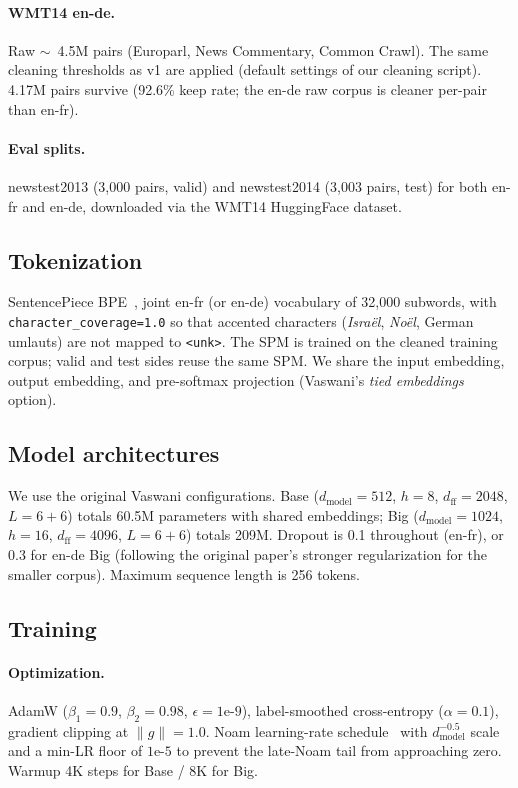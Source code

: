 \paragraph{WMT14 en-de.} Raw $\sim$~4.5M pairs (Europarl, News Commentary, Common Crawl). The same cleaning thresholds as v1 are applied (default settings of our cleaning script). 4.17M pairs survive (92.6\% keep rate; the en-de raw corpus is cleaner per-pair than en-fr).

\paragraph{Eval splits.} newstest2013 (3,000 pairs, valid) and newstest2014 (3,003 pairs, test) for both en-fr and en-de, downloaded via the WMT14 HuggingFace dataset.

\subsection{Tokenization}
SentencePiece BPE~\cite{sennrich2016neural, kudo2018sentencepiece}, joint en-fr (or en-de) vocabulary of 32{,}000 subwords, with \texttt{character\_coverage=1.0} so that accented characters (\textit{Israël}, \textit{Noël}, German umlauts) are not mapped to \texttt{<unk>}. The SPM is trained on the cleaned training corpus; valid and test sides reuse the same SPM. We share the input embedding, output embedding, and pre-softmax projection (Vaswani's \emph{tied embeddings} option).

\subsection{Model architectures}
We use the original Vaswani configurations. Base ($d_\text{model}{=}512$, $h{=}8$, $d_\text{ff}{=}2048$, $L{=}6{+}6$) totals 60.5M parameters with shared embeddings; Big ($d_\text{model}{=}1024$, $h{=}16$, $d_\text{ff}{=}4096$, $L{=}6{+}6$) totals 209M. Dropout is 0.1 throughout (en-fr), or 0.3 for en-de Big (following the original paper's stronger regularization for the smaller corpus). Maximum sequence length is 256 tokens.

\subsection{Training}
\paragraph{Optimization.} AdamW ($\beta_1{=}0.9$, $\beta_2{=}0.98$, $\epsilon{=}1\text{e-}9$), label-smoothed cross-entropy ($\alpha{=}0.1$), gradient clipping at $\|g\|{=}1.0$. Noam learning-rate schedule~\cite{vaswani2017attention} with $d_\text{model}^{-0.5}$ scale and a min-LR floor of $1\text{e-}5$ to prevent the late-Noam tail from approaching zero. Warmup 4K steps for Base / 8K for Big.

